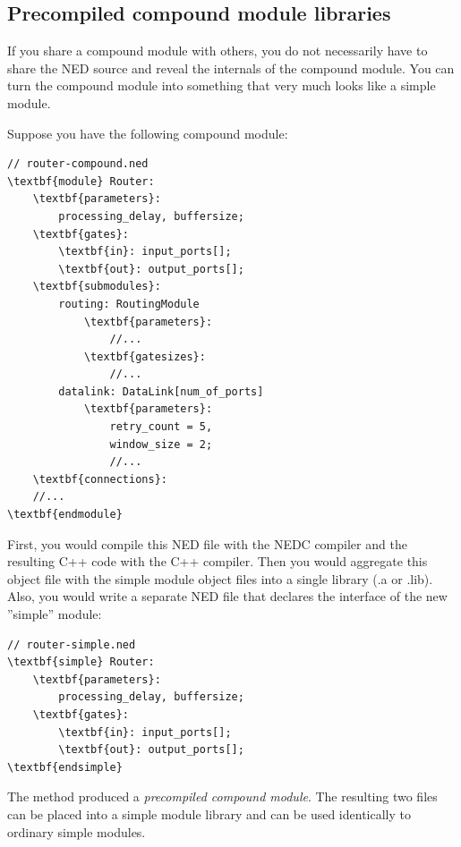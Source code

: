 \subsection{Precompiled compound module libraries}


If you share a compound module with others, you do not necessarily
have to share the NED source and reveal the internals of the compound
module. You can turn the compound module into something that very much
looks like a simple module.


Suppose you have the following compound module:


\begin{Verbatim}[commandchars=\\\{\}]
// router-compound.ned
\textbf{module} Router:
    \textbf{parameters}:
        processing_delay, buffersize;
    \textbf{gates}:
        \textbf{in}: input_ports[];
        \textbf{out}: output_ports[];
    \textbf{submodules}:
        routing: RoutingModule
            \textbf{parameters}:
                //...
            \textbf{gatesizes}:
                //...
        datalink: DataLink[num_of_ports]
            \textbf{parameters}:
                retry_count = 5,
                window_size = 2;
                //...
    \textbf{connections}:
    //...
\textbf{endmodule}
\end{Verbatim}


First, you would compile this NED file with the NEDC compiler
and the resulting C++ code with the C++ compiler. Then you would
aggregate this object file with the simple module object files
into a single library (.a or .lib). Also, you would write a separate
NED file that declares the interface of the new ''simple''
module:


\begin{Verbatim}[commandchars=\\\{\}]
// router-simple.ned
\textbf{simple} Router:
    \textbf{parameters}:
        processing_delay, buffersize;
    \textbf{gates}:
        \textbf{in}: input_ports[];
        \textbf{out}: output_ports[];
\textbf{endsimple}
\end{Verbatim}



The method produced a \textit{precompiled compound
  module}. The resulting two files
can be placed into a simple module library and
can be used identically to ordinary simple
modules.

